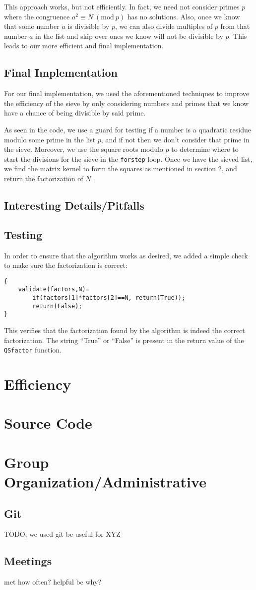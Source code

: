 \documentclass[titlepage]{article}
\newcommand{\Mod}[1]{\ (\text{mod}\ #1)}
\begin{document}
		This approach works, but not efficiently. In fact, we need not consider primes $p$ where the congruence $a^2 \equiv N \Mod{p}$ has no solutions. Also, once we know that some number $a$ is divisible by $p$, we can also divide multiples of $p$ from that number $a$ in the list and skip over ones we know will not be divisible by $p$. This leads to our more efficient and final implementation.
	
		\subsection{Final Implementation}
		For our final implementation, we used the aforementioned techniques to improve the efficiency of the sieve by only considering numbers and primes that we know have a chance of being divisible by said prime.
		
		As seen in the code, we use a guard for testing if a number is a quadratic residue modulo some prime in the list $p$, and if not then we don't consider that prime in the sieve. Moreover, we use the square roots modulo $p$ to determine where to start the divisions for the sieve in the \verb|forstep| loop. Once we have the sieved list, we find the matrix kernel to form the squares as mentioned in section 2, and return the factorization of $N$.
	
		\subsection{Interesting Details/Pitfalls}
	
		\subsection{Testing}
		In order to ensure that the algorithm works as desired, we added a simple check to make sure the factorization is correct:
\begin{lstlisting}
{
	validate(factors,N)=
		if(factors[1]*factors[2]==N, return(True));
		return(False);
}
\end{lstlisting}
	
	This verifies that the factorization found by the algorithm is indeed the correct factorization. The string ``True'' or ``False'' is present in the return value of the \verb|QSfactor| function.
	
	\section{Efficiency}
	
	\section{Source Code}
	
	\section{Group Organization/Administrative}
	
		\subsection{Git}
		TODO, we used git bc useful for XYZ

		\subsection{Meetings}
		met how often? helpful bc why?
	
\end{document}
